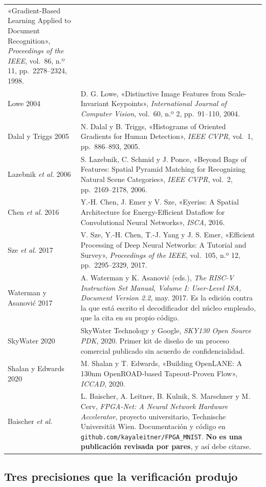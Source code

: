 \begin{longtable}[]{@{}
  >{\raggedright\arraybackslash}p{}
  >{\raggedright\arraybackslash}p{}@{}}
«Gradient-Based Learning Applied to Document Recognition»,
\emph{Proceedings of the IEEE}, vol.~86, n.º 11, pp.~2278--2324,
1998. \\
Lowe 2004 & D. G. Lowe, «Distinctive Image Features from Scale-Invariant
Keypoints», \emph{International Journal of Computer Vision}, vol.~60,
n.º 2, pp.~91--110, 2004. \\
Dalal y Triggs 2005 & N. Dalal y B. Triggs, «Histograms of Oriented
Gradients for Human Detection», \emph{IEEE CVPR}, vol.~1, pp.~886--893,
2005. \\
Lazebnik \emph{et al.} 2006 & S. Lazebnik, C. Schmid y J. Ponce, «Beyond
Bags of Features: Spatial Pyramid Matching for Recognizing Natural Scene
Categories», \emph{IEEE CVPR}, vol.~2, pp.~2169--2178, 2006. \\
Chen \emph{et al.} 2016 & Y.-H. Chen, J. Emer y V. Sze, «Eyeriss: A
Spatial Architecture for Energy-Efficient Dataflow for Convolutional
Neural Networks», \emph{ISCA}, 2016. \\
Sze \emph{et al.} 2017 & V. Sze, Y.-H. Chen, T.-J. Yang y J. S. Emer,
«Efficient Processing of Deep Neural Networks: A Tutorial and Survey»,
\emph{Proceedings of the IEEE}, vol.~105, n.º 12, pp.~2295--2329,
2017. \\
Waterman y Asanović 2017 & A. Waterman y K. Asanović (eds.), \emph{The
RISC-V Instruction Set Manual, Volume I: User-Level ISA, Document
Version 2.2}, may. 2017. Es la edición contra la que está escrito el
decodificador del núcleo empleado, que la cita en su propio código. \\
SkyWater 2020 & SkyWater Technology y Google, \emph{SKY130 Open Source
PDK}, 2020. Primer kit de diseño de un proceso comercial publicado sin
acuerdo de confidencialidad. \\
Shalan y Edwards 2020 & M. Shalan y T. Edwards, «Building OpenLANE: A
130nm OpenROAD-based Tapeout-Proven Flow», \emph{ICCAD}, 2020. \\
Baischer \emph{et al.} & L. Baischer, A. Leitner, B. Kulnik, S.
Marschner y M. Cerv, \emph{FPGA-Net: A Neural Network Hardware
Accelerator}, proyecto universitario, Technische Universität Wien.
Documentación y código en \texttt{github.com/kayaleitner/FPGA\_MNIST}.
\textbf{No es una publicación revisada por pares}, y así debe
citarse. \\
\end{longtable}

\subsection{Tres precisiones que la verificación
produjo}\label{tres-precisiones-que-la-verificaciuxf3n-produjo}

